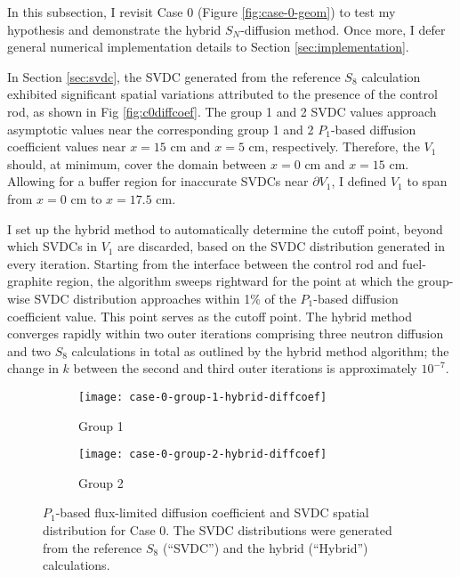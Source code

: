 In this subsection, I revisit Case 0
(Figure \ref{fig:case-0-geom}) to test my hypothesis and demonstrate the hybrid $S_N$-diffusion
method. Once more, I defer general numerical implementation details to
Section \ref{sec:implementation}.

In Section \ref{sec:svdc}, the \gls{SVDC} generated from the reference $S_8$ calculation exhibited
significant spatial variations attributed to the presence of the control rod, as shown in Fig
\ref{fig:c0diffcoef}. The group 1 and 2 \gls{SVDC} values approach asymptotic values near the
corresponding group 1 and 2 $P_1$-based diffusion coefficient values near $x=15$ cm and $x=5$ cm,
respectively. Therefore, the $V_1$ should, at minimum, cover the domain between $x=0$ cm and
$x=15$ cm. Allowing for a buffer region for inaccurate \glspl{SVDC} near $\partial V_1$, I
defined $V_1$ to span from $x=0$ cm to $x=17.5$ cm.

I set up the hybrid method to automatically determine the cutoff point, beyond which \glspl{SVDC}
in $V_1$ are discarded, based on the \gls{SVDC} distribution generated in every iteration.
Starting from the interface between the control rod and fuel-graphite region, the algorithm sweeps
rightward for the point at which the group-wise \gls{SVDC} distribution approaches within 1\% of
the $P_1$-based diffusion coefficient value. This point serves as the cutoff point. The hybrid
method converges rapidly within two outer iterations comprising three neutron diffusion and two
$S_8$ calculations in total as outlined by the hybrid method algorithm; the change in $k$ between
the second and third outer iterations is approximately $10^{-7}$.
%
\begin{figure}[htb!]
  \centering
  \begin{subfigure}[b]{.49\textwidth}
    \centering
    \texttt{[image: case-0-group-1-hybrid-diffcoef]}
    \caption{Group 1}
    \label{fig:c0g1hd}
  \end{subfigure}
  \hfill
  \begin{subfigure}[b]{.49\textwidth}
    \centering
    \texttt{[image: case-0-group-2-hybrid-diffcoef]}
    \caption{Group 2}
    \label{fig:c0g2hd}
  \end{subfigure}
  \caption{$P_1$-based flux-limited diffusion coefficient and \gls{SVDC} spatial distribution for
  Case 0. The \gls{SVDC} distributions were generated from the reference $S_8$ (``SVDC'') and the
  hybrid (``Hybrid'') calculations.}
  \label{fig:c0hd}
\end{figure}


